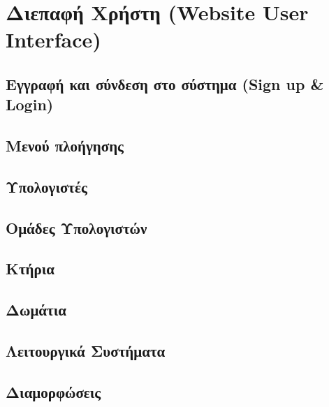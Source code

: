 \chapter{Διεπαφή Χρήστη (Website User Interface)}

\section{Εγγραφή και σύνδεση στο σύστημα (Sign up \& Login)}

\section{Μενού πλοήγησης}

\section{Υπολογιστές}

\section{Ομάδες Υπολογιστών}

\section{Κτήρια}

\section{Δωμάτια}

\section{Λειτουργικά Συστήματα}

\section{Διαμορφώσεις}
